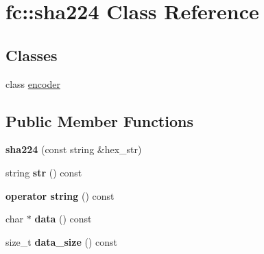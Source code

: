 \hypertarget{classfc_1_1sha224}{}\section{fc\+:\+:sha224 Class Reference}
\label{classfc_1_1sha224}
\subsection*{Classes}
\begin{DoxyCompactItemize}
\item 
class \mbox{\hyperlink{classfc_1_1sha224_1_1encoder}{encoder}}
\end{DoxyCompactItemize}
\subsection*{Public Member Functions}
\begin{DoxyCompactItemize}
\item 
\mbox{\label{classfc_1_1sha224_a528c68a4b7ee5a34a3e3931571a9eb92}} 
{\bfseries sha224} (const string \&hex\+\_\+str)
\item 
\mbox{\label{classfc_1_1sha224_a52fd482a17e52873138b600761365882}} 
string {\bfseries str} () const
\item 
\mbox{\label{classfc_1_1sha224_a60dce074da8e4e78283baf7f377b7715}} 
{\bfseries operator string} () const
\item 
\mbox{\label{classfc_1_1sha224_aba02a2b081db22c601a37876ff2407f0}} 
char $\ast$ {\bfseries data} () const
\item 
\mbox{\label{classfc_1_1sha224_a1245018b3c15d5ab3ec338e1cfc52e47}} 
size\+\_\+t {\bfseries data\+\_\+size} () const
\end{DoxyCompactItemize}
